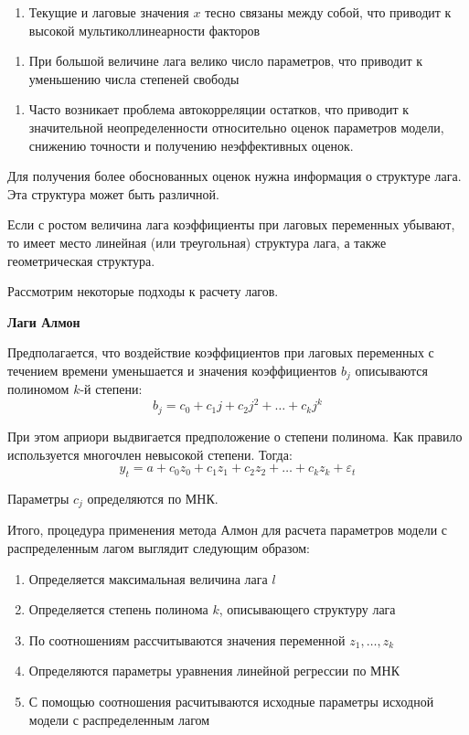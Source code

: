 \documentclass[aps,%
12pt,%
final,%
oneside,
onecolumn,%
musixtex, %
superscriptaddress,%
centertags]{article} %
\theoremstyle{plain}
\theoremstyle{definition}
\theoremstyle{remark}
\begin{document}
\begin{enumerate}
	\item Текущие и лаговые значения $x$ тесно связаны между собой, что приводит к высокой мультиколлинеарности факторов
\end{enumerate}
\begin{enumerate}
	\item При большой величине лага велико число параметров, что приводит к уменьшению числа степеней свободы
\end{enumerate}
\begin{enumerate}
	\item Часто возникает проблема автокорреляции остатков, что приводит к значительной неопределенности относительно оценок параметров модели, снижению точности и получению неэффективных оценок.
\end{enumerate}

Для получения более обоснованных оценок нужна информация о структуре лага. Эта структура может быть различной.

Если с ростом величина лага коэффициенты при лаговых переменных убывают, то имеет место линейная (или треугольная) структура лага, а также геометрическая структура. 

Рассмотрим некоторые подходы к расчету лагов.

\textbf{Лаги Алмон}

Предполагается, что воздействие коэффициентов при лаговых переменных с течением времени уменьшается и значения коэффициентов $b_j$ описываются полиномом $k$-й степени:
$$b_j = c_0 + c_1j + c_2j^2 + \ldots + c_kj^k$$

При этом априори выдвигается предположение о степени полинома. Как правило используется многочлен невысокой степени. Тогда:
$$y_t = a + c_0z_0 + c_1z_1 + c_2z_2 + \ldots + c_kz_k + \varepsilon_t$$

Параметры $c_j$ определяются по МНК.

Итого, процедура применения метода Алмон для расчета параметров модели с распределенным лагом выглядит следующим образом:

\begin{enumerate}
	\item Определяется максимальная величина лага $l$
	\item Определяется степень полинома $k$, описывающего структуру лага
	\item По соотношениям рассчитываются значения переменной $z_1,\ldots,z_k$
	\item Определяются параметры уравнения линейной регрессии по МНК
	\item С помощью соотношения расчитываются исходные параметры исходной модели с распределенным лагом
\end{enumerate}
\end{document}
